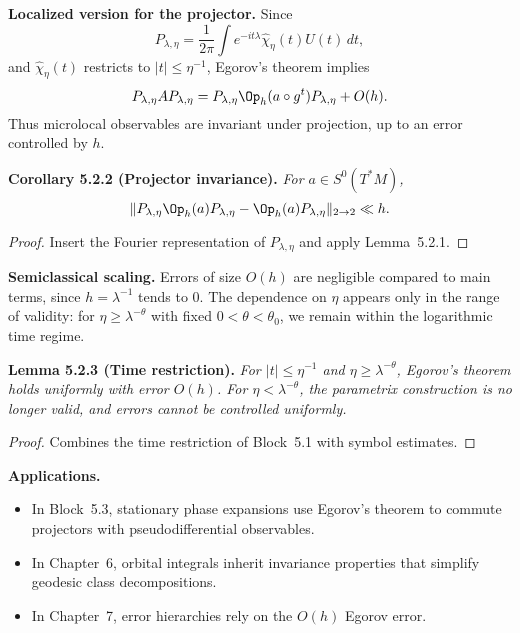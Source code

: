 \medskip

\noindent\textbf{Localized version for the projector.}
Since
\[
  P_{\lambda,\eta} = \frac{1}{2\pi}\int e^{-it\lambda} \widehat{\chi}_\eta(t) U(t)\,dt,
\]
and $\widehat{\chi}_\eta(t)$ restricts to $|t|\le \eta^{-1}$,
Egorov’s theorem implies
\[
  P_{\lambda,\eta} A P_{\lambda,\eta} = P_{\lambda,\eta}\Op_h(a\circ g^t)P_{\lambda,\eta} + O(h).
\]
Thus microlocal observables are invariant under projection,
up to an error controlled by $h$.

\medskip

\noindent\textbf{Corollary 5.2.2 (Projector invariance).}
\emph{For $a\in S^0(T^*M)$,}
\[
  \|P_{\lambda,\eta} \Op_h(a) P_{\lambda,\eta} - \Op_h(a)P_{\lambda,\eta}\|_{2\to 2} \ll h.
\]

\begin{proof}
Insert the Fourier representation of $P_{\lambda,\eta}$ and apply Lemma~5.2.1.
\end{proof}

\medskip

\noindent\textbf{Semiclassical scaling.}
Errors of size $O(h)$ are negligible compared to main terms,
since $h=\lambda^{-1}$ tends to $0$.
The dependence on $\eta$ appears only in the range of validity:
for $\eta\ge \lambda^{-\theta}$ with fixed $0<\theta<\theta_0$,
we remain within the logarithmic time regime.

\medskip

\noindent\textbf{Lemma 5.2.3 (Time restriction).}
\emph{For $|t|\le \eta^{-1}$ and $\eta\ge \lambda^{-\theta}$,
Egorov’s theorem holds uniformly with error $O(h)$.
For $\eta < \lambda^{-\theta}$, the parametrix construction is no longer valid,
and errors cannot be controlled uniformly.}

\begin{proof}
Combines the time restriction of Block~5.1 with symbol estimates.
\end{proof}

\medskip

\noindent\textbf{Applications.}
\begin{itemize}
  \item In Block~5.3, stationary phase expansions use Egorov’s theorem
  to commute projectors with pseudodifferential observables.
  \item In Chapter~6, orbital integrals inherit invariance properties
  that simplify geodesic class decompositions.
  \item In Chapter~7, error hierarchies rely on the $O(h)$ Egorov error.
\end{itemize}

